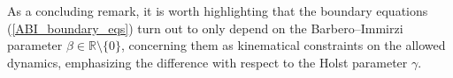 

As a concluding remark, it is worth highlighting that the boundary equations (\ref{ABI_boundary_eqs}) turn out to only depend on the Barbero--Immirzi parameter $\beta \in \mathbb{R} \setminus \{0\}$, concerning them as kinematical constraints on the allowed dynamics, emphasizing the difference with respect to the Holst parameter $\gamma$.